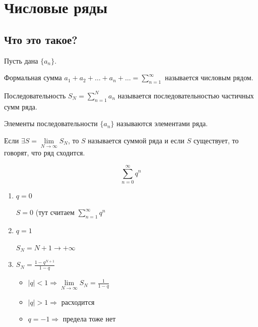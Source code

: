 \section{Числовые ряды}

\subsection{Что это такое?}

\begin{defn}{}{}
    Пусть дана \( \{ a_n \} \).

    Формальная сумма \( a_1 + a_2 + \ldots + a_n + \ldots = \sum\limits_{n = 1}^{\infty} \)
    называется числовым рядом.

    Последовательность \( S_N = \sum\limits_{n = 1}^N a_n \)
    называется последовательностью частичных сумм ряда.

    Элементы последовательности \( \{ a_n \} \) называются элементами ряда.

    Если \( \exists S = \lim\limits_{N \to \infty} S_N \),
    то \( S \) называется суммой ряда и если \( S \) существует, то говорят,
    что ряд сходится.
\end{defn}

\begin{example}{}{}
    \[
        \sum\limits_{n = 0}^{\infty} q^n
    \]
    \begin{enumerate}
        \item
            \( q = 0 \)

            \( S = 0 \) (тут считаем \( \sum\limits_{n = 1}^{\infty} q^n \)
        \item
            \( q = 1 \)

            \( S_N = N + 1 \to +\infty \)
        \item 
            \( S_N = \frac{1 - q^{N + 1}}{1 - q} \)

            \begin{itemize}
                \item
                    \( |q| < 1 \Rightarrow \lim\limits_{N \to \infty} S_N = \frac{1}{1 - q} \)
                \item
                    \( |q| > 1 \Rightarrow \) расходится
                \item
                    \( q = -1 \Rightarrow \) предела тоже нет
            \end{itemize}
    \end{enumerate}
\end{example}

